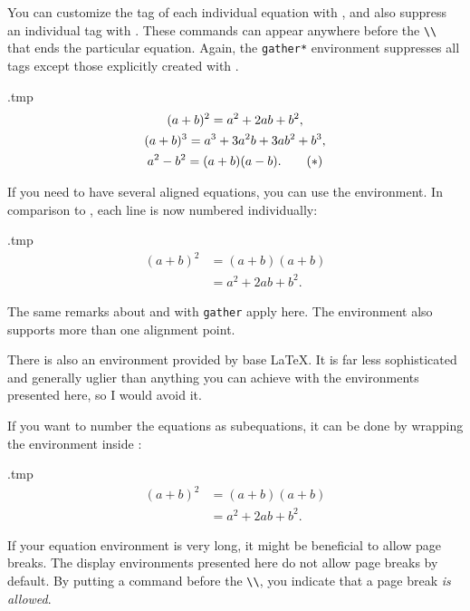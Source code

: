 You can customize the tag of each individual equation with ,
and also suppress an individual tag with .
These commands can appear anywhere before the \verb|\\| that ends the particular equation.
Again, the \verb|gather*| environment suppresses all tags
except those explicitly created with .
%
\begin{VerbatimOut}{\jobname.tmp}
\begin{gather}
(a+b)^2 = a^2 + 2ab + b^2,\\
(a+b)^3 = a^3 + 3a^2 b + 3a b^2 + b^3, \notag\\
a^2 - b^2 = (a+b)(a-b). \tag{$\ast$}
\end{gather}
\end{VerbatimOut}
\ShowExampleBelow

If you need to have several aligned equations, you can use the  environment.
In comparison to , each line is now numbered individually:
%
\begin{VerbatimOut}{\jobname.tmp}
\begin{align}
(a+b)^2
&= (a+b)(a+b)\\
&= a^2 + 2ab + b^2.
\end{align}
\end{VerbatimOut}
\ShowExample
The same remarks about  and  with \verb|gather| apply here.
The  environment also supports more than one alignment point.


\begin{warning}
There is also an  environment provided by base \LaTeX.
It is far less sophisticated and generally uglier than
anything you can achieve with the environments presented here,
so I would avoid it.
\end{warning}

If you want to number the equations as subequations,
it can be done by wrapping the environment inside :
%
\begin{VerbatimOut}{\jobname.tmp}
\begin{subequations}  
  \begin{align}
    (a+b)^2
    &= (a+b)(a+b)\\
    &= a^2 + 2ab + b^2.
  \end{align}
\end{subequations}
\end{VerbatimOut}
\ShowExample


If your equation environment is very long,
it might be beneficial to allow page breaks.
The display environments presented here do not allow page breaks by default.
By putting a  command before the \verb|\\|,
you indicate that a page break \emph{is allowed}.

